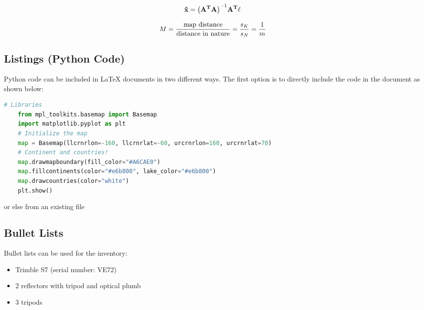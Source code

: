 \begin{equation}
	\numberwithin{equation}{section}
	\mathbf{\hat{x}} = \mathbf{\left(A^T A\right)}^{-1} \mathbf{A^T \ell} \label{eq:adjustment} \\
\end{equation}

\begin{equation}
	\numberwithin{equation}{section}
	M = \frac{\text{map distance}}{\text{distance in nature}} = \frac{s_K}{s_N} = \frac{1}{m} \label{eq:scale} \\
\end{equation}


\subsection{Listings (Python Code)}

Python code can be included in \LaTeX{} documents in two different ways. The first option is to directly include the code in the document as shown below:

\begin{lstlisting}[language=Python, style=Python, caption=Basemap-Anwendung, label={lst:basemap}]
	# Libraries
	from mpl_toolkits.basemap import Basemap
	import matplotlib.pyplot as plt
	# Initialize the map
	map = Basemap(llcrnrlon=-160, llcrnrlat=-60, urcrnrlon=160, urcrnrlat=70)
	# Continent and countries!
	map.drawmapboundary(fill_color="#A6CAE0")
	map.fillcontinents(color="#e6b800", lake_color="#e6b800")
	map.drawcountries(color="white")
	plt.show()
\end{lstlisting} 

or else from an existing file




\subsection{Bullet Lists}

Bullet lists can be used for the inventory:

\begin{itemize}	
	\setlength{\itemsep}{-2pt} %
	\item Trimble S7 (serial number: VE72)
	\item 2 reflectors with tripod and optical plumb
	\item 3 tripods
\end{itemize}

